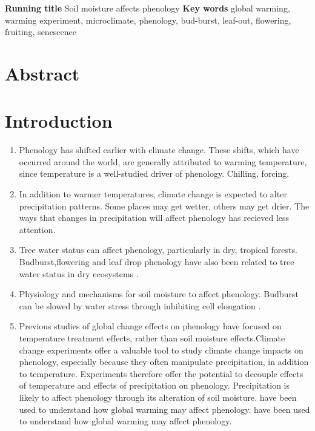 \documentclass{article}
\begin{document}
\begin{singlespace}
\textbf{Running title} Soil moisture affects phenology
\textbf{Key words} global warming, warming experiment, microclimate, phenology, bud-burst, leaf-out, flowering, fruiting, senescence 
\end{singlespace}


\clearpage
\section*{Abstract}

\section* {Introduction}
\begin{singlespace}
\begin{enumerate}
\item Phenology has shifted earlier with climate change. These shifts, which have occurred around the world, are generally attributed to warming temperature, since temperature is a well-studied driver of phenology.  Chilling, forcing. 
\item In addition to warmer temperatures, climate change is expected to alter precipitation patterns. Some places may get wetter, others may get drier. The ways that changes in precipitation will affect phenology has recieved less attention. 
\item Tree water status can affect phenology, particularly in dry, tropical forests. Budburst,flowering and leaf drop phenology have also been related to tree water status in dry ecosystems \citep{essiamah1986,reich1984, van1993}. 
\item Physiology and mechanisms for soil moisture to affect phenology. Budburst can be slowed by water stress through inhibiting cell elongation \citep{essiamah1986}.
\item Previous studies of global change effects on phenology have focused on temperature treatment effects, rather than soil moisture effects.Climate change experiments offer a valuable tool to study climate change impacts on phenology, especially because they often manipulate precipitation, in addition to temperature. Experiments therefore offer the potential to decouple effects of temperature and effects of precipitation on phenology. Precipitation is likely to affect phenology through its alteration of soil moisture.  have been used to understand how global warming may affect phenology.  have been used to understand how global warming may affect phenology. 
\end{enumerate}


\end{singlespace}
\end{document}
